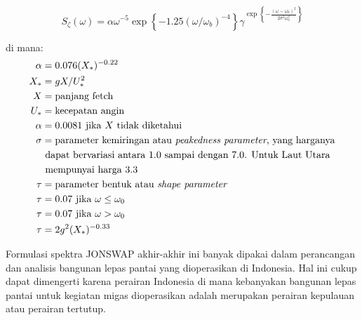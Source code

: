 \begin{equation}
S_\zeta(\omega) = \alpha\omega^{-5} \exp\left\{-1.25(\omega/\omega_b)^{-4}\right\}\gamma^{\exp\left\{-\frac{(\omega-\omega_0)^2}{2\sigma^2\omega_0^2}\right\}}
\end{equation}

di mana:
\begin{align*}
\alpha &= 0.076(X_*)^{-0.22} \\
X_* &= gX/U_*^2 \\
X &= \text{panjang fetch} \\
U_* &= \text{kecepatan angin} \\
\alpha &= 0.0081 \text{ jika } X \text{ tidak diketahui} \\
\sigma &= \text{parameter kemiringan atau \textit{peakedness parameter}, yang harganya} \\
      &\text{  dapat bervariasi antara 1.0 sampai dengan 7.0. Untuk Laut Utara} \\
      &\text{  mempunyai harga 3.3} \\
\tau &= \text{parameter bentuk atau \textit{shape parameter}} \\
\tau &= 0.07 \text{ jika } \omega \leq \omega_0 \\
\tau &= 0.07 \text{ jika } \omega > \omega_0 \\
\tau &= 2g^2(X_*)^{-0.33}
\end{align*}

Formulasi spektra JONSWAP akhir-akhir ini banyak dipakai dalam perancangan dan analisis bangunan lepas pantai yang dioperasikan di Indonesia. Hal ini cukup dapat dimengerti karena perairan Indonesia di mana kebanyakan bangunan lepas pantai untuk kegiatan migas dioperasikan adalah merupakan perairan kepulauan atau perairan tertutup.